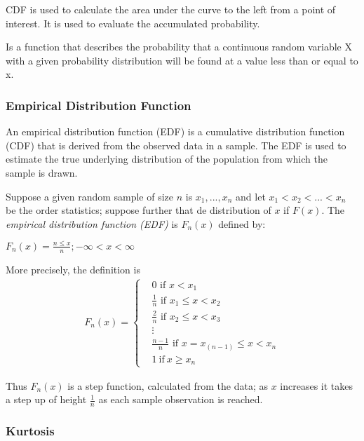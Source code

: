 \documentclass[11pt]{article}
\begin{document}
CDF is used to calculate the area under the curve to the left from a
point of interest. It is used to evaluate the accumulated probability.

Is a function that describes the probability that a continuous random
variable X with a given probability distribution will be found at a
value less than or equal to x.

\hypertarget{empirical-distribution-function}{%
\subsubsection{Empirical Distribution
Function}\label{empirical-distribution-function}}

An empirical distribution function (EDF) is a cumulative distribution
function (CDF) that is derived from the observed data in a sample. The
EDF is used to estimate the true underlying distribution of the
population from which the sample is drawn.

Suppose a given random sample of size \(n\) is \(x_1, ..., x_n\) and let
\(x_1 < x_2 < ... < x_n\) be the order statistics; suppose further that
de distribution of \(x\) if \(F(x)\). The \emph{empirical distribution
function (EDF)} is \(F_n(x)\) defined by:

\(F_n(x) = \frac{n \leq x}{n}; -\infty < x < \infty\)

More precisely, the definition is
\begin{gather}
  F_n(x) = \begin{cases}  & 0 \text{ if } x < x_1\\  & \frac{1}{n} \text{ if } x_1 \leq x <x_2 \\  & \frac{2}{n} \text{ if } x_2 \leq x < x_3 \\  & \vdots \\  & \frac{n-1}{n}\text{ if } x = x_(n-1) \leq x < x_n \\  & 1 \ \text{if} \ x \geq x_n \end{cases}
\end{gather}

Thus \(F_n(x)\) is a step function, calculated from the data; as \(x\)
increases it takes a step up of height \(\frac{1}{n}\) as each sample
observation is reached.


\hypertarget{kurtosis}{%
\subsubsection{Kurtosis}\label{kurtosis}}
\end{document}
